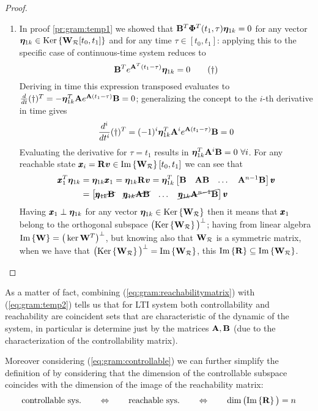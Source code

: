 \begin{proof}
\begin{enumerate}[\itshape a)]
			\item In proof \ref{pr:gram:temp1} we showed that $\mathbf{B}^T\mathbf{\Phi}^T(t_1,\tau) \boldsymbol{\eta}_{1k} = 0$ for any vector $\boldsymbol{\eta}_{1k} \in \textrm{Ker}\left\{\mathbf{W}_\mathcal R[t_0,t_1]\right\}$ and for any time $\tau \in [t_0,t_1]$: applying this to the specific case of continuous-time system reduces to
			\[ \mathbf{B}^T e^{\mathbf{A}^T (t_1-\tau)} \boldsymbol{\eta}_{1k} = 0 \tag{$\dagger$} \]
			Deriving in time this expression transposed evaluates to $\frac d{dt}(\dagger)^T = -\boldsymbol{\eta}_{1k}^T \mathbf{A} e^{\mathbf{A}(t_1-\tau)} \mathbf{B} = 0$;  generalizing the concept to the $i$-th derivative in time gives
			\[ \frac{d^i}{dt^i}(\dagger)^T = (-1)^i \boldsymbol{\eta}_{1k}^T \mathbf{A}^i e^{\mathbf{A}(t_1-\tau)}\mathbf{B} = 0 \]
			Evaluating the derivative for $\tau = t_1$ results in $\vett \eta_{1k}^T \A^i \B = 0 \ \forall i$. For any reachable state $\pmb{x}_i = \mathbf{R} \boldsymbol{v} \in \textrm{Im}\left\{\mathbf{W}_\mathcal R\right\}[t_0,t_1]$ we can see that
			\begin{align*}
				\pmb{x}_1^T \boldsymbol{\eta}_{1k} & = \boldsymbol{\eta}_{1k} \pmb{x}_1 = \boldsymbol{\eta}_{1k} \mathbf{R} \boldsymbol{v} = \boldsymbol{\eta}_{1k}^T \begin{bmatrix}  \mathbf{B} & \mathbf{A} \mathbf{B} & \dots & \mathbf{A}^{n-1} \mathbf{B}  \end{bmatrix} \pmb{v} \\ &
				= \begin{bmatrix} \cancel{\pmb{\eta}_{1k} \mathbf{B}} & \cancel{\pmb{\eta}_{1k} \mathbf{A} \mathbf{B}} & \dots & \cancel{\pmb{\eta}_{1k} \mathbf{A}^{n-1}\mathbf{B}}  \end{bmatrix} \pmb{v}
			\end{align*}
			Having $\pmb{x}_1 \perp \boldsymbol{\eta}_{1k}$ for any vector $\boldsymbol{\eta}_{1k} \in \textrm{Ker}\left\{\mathbf{W}_\mathcal R\right\}$ then it means that $\pmb{x}_1$ belong to the orthogonal subspace $\big(\textrm{Ker}\left\{\mathbf{W}_\mathcal R\right\}\big)^\perp$; having from linear algebra $\textrm{Im}\left\{\mathbf{W}\right\} = \big(\ker{\mathbf{W}^T}\big)^\perp$, but knowing also that $\mathbf{W}_\mathcal R$ is a symmetric matrix, when we have that $\big(\textrm{Ker}\left\{\mathbf{W}_\mathcal R\right\}\big)^\perp = \textrm{Im}\left\{\mathbf{W}_\mathcal R\right\}$, this $\textrm{Im}\left\{\mathbf{R}\right\} \subseteq \textrm{Im}\left\{\mathbf{W}_\mathcal R\right\}$.
		\end{enumerate}
	\end{proof}
	
	As a matter of fact, combining (\ref{eq:gram:reachabilitymatrix}) with (\ref{eq:gram:temp2}) tells us that for LTI system both controllability and reachability are coincident sets that are characteristic of the dynamic of the system, in particular is determine just by the matrices $\mathbf{A},\mathbf{B}$ (due to the characterization of the controllability matrix).
	
	Moreover considering (\ref{eq:gram:controllable}) we can further simplify the definition of  by considering that the dimension of the controllable subspace coincides with the dimension of the image of the reachability matrix:
	\begin{equation}
		\textrm{controllable sys.} \qquad \Leftrightarrow \qquad \textrm{reachable sys.} \qquad \Leftrightarrow \qquad  \dim \big(\textrm{Im}\left\{\mathbf{R}\right\}\big) = n
	\end{equation}
	
